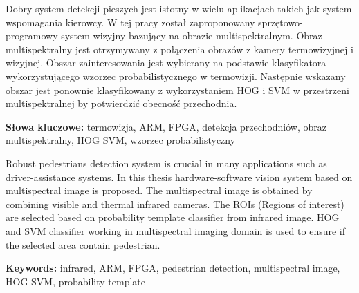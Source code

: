 \documentclass[12pt]{aghdpl}
\author{Tomasz Kańka}
\date{2018}
\newenvironment{abstractpage}
{\cleardoublepage\vspace*{\fill}\thispagestyle{empty} }
{\vfill\cleardoublepage}
\renewenvironment{abstract}[1]
{\bigskip\selectlanguage{#1}%
	\begin{center}\bfseries\abstractname\end{center}}
{\par\bigskip}
\begin{document}
\titlepages

\begin{abstractpage}
	\begin{abstract}{polish}
Dobry system detekcji pieszych jest istotny w wielu aplikacjach takich jak system wspomagania kierowcy. W tej pracy został zaproponowany sprzętowo-programowy system wizyjny bazujący na obrazie multispektralnym. Obraz multispektralny jest otrzymywany z połączenia obrazów z kamery termowizyjnej i wizyjnej. Obszar zainteresowania jest wybierany na podstawie klasyfikatora wykorzystującego wzorzec probabilistycznego w termowizji. Następnie wskazany obszar jest ponownie klasyfikowany z wykorzystaniem HOG i SVM w przestrzeni multispektralnej by potwierdzić obecność przechodnia.
		
		\textbf{Słowa kluczowe:} 
termowizja, ARM, FPGA, detekcja przechodniów, obraz multispektralny, HOG SVM, wzorzec probabilistyczny
		
	\end{abstract}
	
	\begin{abstract}{english}
Robust pedestrians detection system is crucial in many applications such as driver-assistance systems. In this thesis hardware-software vision system based on multispectral image is proposed. The multispectral image is obtained by combining visible and thermal infrared cameras. The ROIs (Regions of interest) are selected based on probability template classifier from infrared image. HOG and SVM classifier working in multispectral imaging domain is used to ensure if the selected area contain pedestrian.

		
		\textbf{Keywords:} 
infrared, ARM, FPGA, pedestrian detection, multispectral image, HOG SVM, probability template	
	\end{abstract}
\end{abstractpage}

{
	\fancyhf{}
	\renewcommand{\headrulewidth}{0pt}
	\renewcommand{\footrulewidth}{0pt}
}

\setcounter{tocdepth}{2}
\tableofcontents
\clearpage








\nocite{*}
\printbibliography
\appendix


\end{document}
